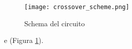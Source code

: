 \documentclass[../Relazione_circuiti]{subfiles}
\begin{document}
\begin{figure}[H]
  \centering
  \texttt{[image: crossover\_scheme.png]}

  \caption{Schema del circuito}
  \label{fig:schema_circuito}

\end{figure}

e (Figura \ref{fig:schema_circuito}).
\end{document}
